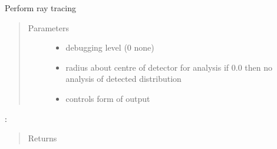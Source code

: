 \documentclass[letterpaper,10pt,english]{sphinxmanual}
\begin{document}
\begin{fulllineitems}
\label{\detokenize{xsrt_functions:xsrt.trace}}
Perform ray tracing
\begin{quote}\begin{description}
\item[{Parameters}] \leavevmode\begin{itemize}
\item {} 
 \textendash{} debugging level (0 none)

\item {} 
 \textendash{} radius about centre of detector for analysis
if 0.0 then no analysis of detected distribution

\item {} 
 \textendash{} controls form of output

\end{itemize}

\end{description}\end{quote}
\begin{description}
\item[{:}] \leavevmode
{}

\end{description}
\begin{quote}\begin{description}
\item[{Returns}] \leavevmode


\end{description}
\end{quote}
\end{fulllineitems}
\end{document}
